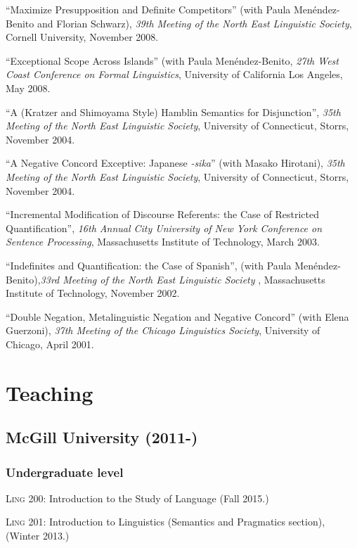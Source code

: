 \documentclass[11pt]{article}
\begin{document}
``Maximize Presupposition and Definite Competitors'' (with
  Paula Men\'endez-Benito and Florian Schwarz), \textit{39th
  Meeting of the North East Linguistic Society}, Cornell University, November 2008. 


``Exceptional Scope Across Islands'' (with Paula Men\'endez-Benito, \textit{27th West Coast Conference on
  Formal Linguistics}, University of California Los Angeles, May 2008. 


``A (Kratzer and Shimoyama Style) Hamblin Semantics for Disjunction'', \textit{35th
  Meeting of the North East Linguistic Society}, University of Connecticut, Storrs, November 2004. 


``A Negative Concord Exceptive: Japanese \textit{-sika}'' (with Masako Hirotani), \textit{35th
  Meeting of the North East Linguistic Society}, University of Connecticut, Storrs, November 2004. 


``Incremental Modification of Discourse Referents: the Case of Restricted Quantification'', \textit{16th Annual City University of New York Conference on Sentence Processing}, Massachusetts Institute of Technology, March 2003. 

``Indefinites and Quantification: the Case of Spanish'', (with Paula Men\'endez-Benito),\textit{33rd
  Meeting of the North East Linguistic Society} , Massachusetts Institute of Technology,  November 2002. 

``Double Negation, Metalinguistic Negation and Negative
Concord'' (with Elena Guerzoni), \textit{37th Meeting of the Chicago
  Linguistics Society}, University of Chicago, April 2001. 

\section*{Teaching}

\subsection*{McGill University (2011-)}

\subsubsection*{Undergraduate level}

\textsc{Ling} 200: Introduction to the Study of Language (Fall 2015.)

\textsc{Ling} 201: Introduction to Linguistics (Semantics and Pragmatics
section), (Winter 2013.)
\end{document}
